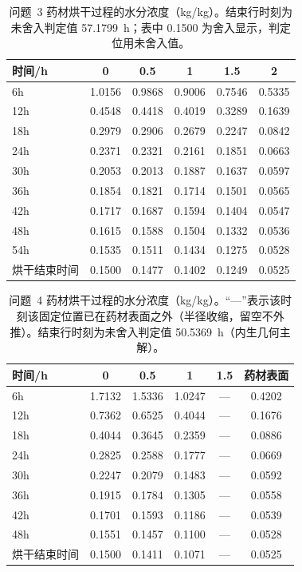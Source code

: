 \begin{table}[htbp]
\centering
\caption{问题~3 药材烘干过程的水分浓度（kg/kg）。结束行时刻为未舍入判定值 57.1799~h；表中 0.1500 为舍入显示，判定位用未舍入值。}
\label{tab:表5}
\small
\begin{tabular}{lccccc}
\toprule
时间/h & 0 & 0.5 & 1 & 1.5 & 2 \\
\midrule
6h & 1.0156 & 0.9868 & 0.9006 & 0.7546 & 0.5335 \\
12h & 0.4548 & 0.4418 & 0.4019 & 0.3289 & 0.1639 \\
18h & 0.2979 & 0.2906 & 0.2679 & 0.2247 & 0.0842 \\
24h & 0.2371 & 0.2321 & 0.2161 & 0.1851 & 0.0663 \\
30h & 0.2053 & 0.2013 & 0.1887 & 0.1637 & 0.0597 \\
36h & 0.1854 & 0.1821 & 0.1714 & 0.1501 & 0.0565 \\
42h & 0.1717 & 0.1687 & 0.1594 & 0.1404 & 0.0547 \\
48h & 0.1615 & 0.1588 & 0.1504 & 0.1332 & 0.0536 \\
54h & 0.1535 & 0.1511 & 0.1434 & 0.1275 & 0.0528 \\
烘干结束时间 & 0.1500 & 0.1477 & 0.1402 & 0.1249 & 0.0525 \\
\bottomrule
\end{tabular}
\end{table}

\begin{table}[htbp]
\centering
\caption{问题~4 药材烘干过程的水分浓度（kg/kg）。“—”表示该时刻该固定位置已在药材表面之外（半径收缩，留空不外推）。结束行时刻为未舍入判定值 50.5369~h（内生几何主解）。}
\label{tab:表6}
\small
\begin{tabular}{lccccc}
\toprule
时间/h & 0 & 0.5 & 1 & 1.5 & 药材表面 \\
\midrule
6h & 1.7132 & 1.5336 & 1.0247 & — & 0.4202 \\
12h & 0.7362 & 0.6525 & 0.4044 & — & 0.1676 \\
18h & 0.4044 & 0.3645 & 0.2359 & — & 0.0886 \\
24h & 0.2825 & 0.2588 & 0.1777 & — & 0.0669 \\
30h & 0.2247 & 0.2079 & 0.1483 & — & 0.0592 \\
36h & 0.1915 & 0.1784 & 0.1305 & — & 0.0558 \\
42h & 0.1701 & 0.1593 & 0.1186 & — & 0.0539 \\
48h & 0.1551 & 0.1457 & 0.1100 & — & 0.0528 \\
烘干结束时间 & 0.1500 & 0.1411 & 0.1071 & — & 0.0525 \\
\bottomrule
\end{tabular}
\end{table}